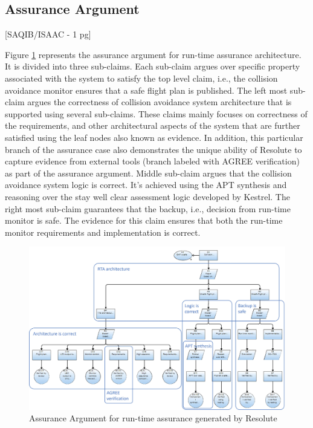 \subsection{Assurance Argument}

[SAQIB/ISAAC - 1 pg]

Figure \ref{fig:rta-resolute} represents the assurance argument for run-time assurance architecture. It is divided into three sub-claims. Each sub-claim argues over specific property associated with the system to satisfy the top level claim, i.e., the collision avoidance monitor ensures that a safe flight plan is published. The left most sub-claim argues the correctness of  collision avoidance system architecture that is supported using several sub-claims. These claims mainly focuses on correctness of the requirements, and other architectural aspects of the system that are further satisfied using the leaf nodes also known as evidence. In addition, this particular branch of the assurance case also demonstrates the unique ability of Resolute to capture evidence from external tools (branch labeled with AGREE verification) as part of the assurance argument. Middle sub-claim argues that the collision avoidance system logic is correct. It's achieved using the APT synthesis and reasoning over the stay well clear assessment logic developed by Kestrel. The right most sub-claim guarantees that the backup, i.e., decision from run-time monitor is safe. The evidence for this claim ensures that both the run-time monitor requirements and implementation is correct. 


\begin{figure}
	\centering
	\includegraphics[width=\textwidth]{figures/rta-resolute.jpg}
	\caption{Assurance Argument for run-time assurance generated by Resolute}
	\label{fig:rta-resolute}
\end{figure}
